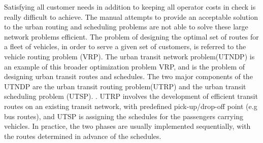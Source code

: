 Satisfying all customer needs in addition to keeping all operator costs in check is really difficult to achieve. The manual attempts to provide an acceptable solution to the urban routing and scheduling problems are not able to solve these large network problems efficient. The problem of designing the optimal set of routes for a fleet of vehicles, in order to serve a given set of customers, is referred to the vehicle routing problem (VRP). The urban transit network problem(UTNDP) is an example of this broader optimization problem VRP, and is the problem of designing urban transit routes and schedules. The two major components of the UTNDP are the urban transit routing problem(UTRP) and the urban transit scheduling problem (UTSP). \citep{fan09}. UTRP involves the development of efficient transit routes on an existing transit network, with predefined pick-up/drop-off point (e.g bus routes), and UTSP is assigning the schedules for the passengers carrying vehicles. In practice, the two phases are usually implemented sequentially, with the routes determined in advance of the schedules. 













